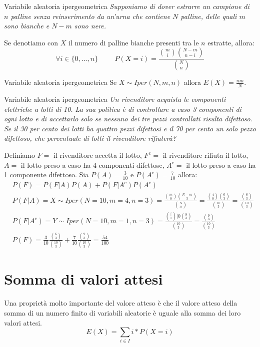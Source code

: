 \begin{Example}{Variabile aleatoria ipergeometrica}{}
    \textit{Supponiamo di dover estrarre un campione di $n$ palline senza reinserimento da un’urna che contiene $N$ palline, delle quali $m$ sono bianche e $N - m$ sono nere.} 
    
    Se denotiamo con $X$ il numero di palline bianche presenti tra le $n$ estratte, allora:
    \begin{equation*}
        \forall i\in \{0,...,n\}\hspace{1cm}P(X=i)=\frac{\binom{m}{i}\binom{N-m}{n-i}}{\binom{N}{n}}
    \end{equation*}
\end{Example}

\begin{Lemma}{Variabile aleatoria ipergeometrica}{}
    Se $X\sim Iper(N, m, n)$ allora $E(X)=\frac{nm}{N}$.
\end{Lemma}

\begin{Example}{Variabile aleatoria ipergeometrica}{}
    \textit{Un rivenditore acquista le componenti elettriche a lotti di 10. La sua politica è di controllare a caso 3 componenti di ogni lotto e di accettarlo solo se nessuno dei tre pezzi controllati risulta difettoso. Se il 30 per cento dei lotti ha quattro pezzi difettosi e il 70 per cento un solo pezzo difettoso, che percentuale di lotti il rivenditore rifiuterà?}

    Definiamo $F=$ il rivenditore accetta il lotto, $F^c=$ il rivenditore rifiuta il lotto, $A=$ il lotto preso a caso ha 4 componenti difettose, $A^c=$ il lotto preso a caso ha 1 componente difettoso. Sia $P(A)=\frac{3}{10}$ e $P(A^c)=\frac{7}{10}$ allora:
    \begin{align*}
        &P(F)=P(F|A)P(A)+P(F|A^c)P(A^c)\\
        &P(F|A)=X\sim Iper(N=10, m=4, n=3)=\frac{\binom{m}{0}\binom{N-m}{3}}{\binom{N}{n}}=\frac{\binom{4}{0}\binom{6}{3}}{\binom{10}{3}}=\frac{\binom{6}{3}}{\binom{10}{3}}\\
        &P(F|A^c)=Y\sim Iper(N=10, m=1, n=3)=\frac{\binom[1]{0}\binom{9}{3}}{\binom{10}{3}}=\frac{\binom{9}{3}}{\binom{10}{3}}\\
        &P(F)=\frac{3}{10}\frac{\binom{6}{3}}{\binom{10}{3}}+\frac{7}{10}\frac{\binom{9}{3}}{\binom{10}{3}}=\frac{54}{100}
    \end{align*}
\end{Example}

\section{Somma di valori attesi}
Una proprietà molto importante del valore atteso è che il valore atteso della somma di un numero finito di variabili aleatorie è uguale alla somma dei loro valori attesi.
\begin{equation*}
    E(X)=\sum_{i\in I}i*P(X=i)
\end{equation*}

